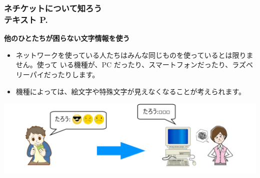 \begin{frame}[fragile]
    \frametitle{ネチケットについて知ろう\\テキスト P.\pageref{1:P:Netiquette}~~~}
    \large\textbf{他のひとたちが困らない文字情報を使う}
            \begin{itemize}\small
                \item ネットワークを使っている人たちはみんな同じものを使っているとは限りません。使って
                いる機種が、PC だったり、スマートフォンだったり、ラズベリーパイだったりします。
                \item 機種によっては、絵文字や特殊文字が見えなくなることが考えられます。                
            \end{itemize}
            \vfill
            
			\begin{minipage}{\textwidth}
                {\upshape
                  \includegraphics[width=\textwidth]{slide07-img/slide07-img005.png}}
            \end{minipage}
\end{frame}

